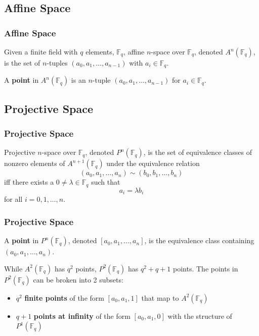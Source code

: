 \documentclass{beamer}
\begin{document}
    \subsection{Affine Space}
    \begin{frame}
        \frametitle{Affine Space}
        \begin{definition}
            Given a finite field with \(q\) elements, \(\mathbb{F}_q\),
            affine \(n\)-space over \(\mathbb{F}_q\), denoted
            \(A^n(\mathbb{F}_q)\), is the set of
            \(n\)-tuples \((a_0, a_1, \dots, a_{n - 1})\) with
            \(a_i \in \mathbb{F}_q.\)
        \end{definition}
        \vfill
        \begin{definition}
            A \textbf{point} in \(A^n(\mathbb{F}_q)\) is an \(n\)-tuple
            \((a_0, a_1, \dots, a_{n - 1})\) for \(a_i \in \mathbb{F}_q\).
        \end{definition}
    \end{frame}

    \subsection{Projective Space}
    \begin{frame}
        \frametitle{Projective Space}
        \begin{definition}
            Projective \(n\)-space over \(\mathbb{F}_q\), denoted
            \(P^n(\mathbb{F}_q)\), is the set of equivalence classes of
            nonzero elements of \(A^{n+1}(\mathbb{F}_q)\) under the
            equivalence relation
            \[(a_0, a_1, \dots, a_n) \sim (b_0, b_1, \dots, b_n)\] iff there
            exists a \(0 \neq \lambda \in \mathbb{F}_q\) such that
            \[a_i = \lambda b_i\] for all \(i = 0, 1, \dots, n\).
        \end{definition}
    \end{frame}

    \begin{frame}
        \frametitle{Projective Space}
        \begin{definition}
            A \textbf{point} in \(P^n(\mathbb{F}_q)\), denoted
            \([a_0, a_1, \dots, a_n]\), is the equivalence class
            containing \((a_0, a_1, \dots, a_n)\).
        \end{definition}
        \vfill
        While \(A^2(\mathbb{F}_q)\) has \(q^2\) points,
        \(P^2(\mathbb{F}_q)\) has \(q^2 + q + 1\) points.
        \vfill
        The points in \(P^2(\mathbb{F}_q)\) can be broken into 2 subsets:
        \begin{itemize}
            \item \(q^2\) \textbf{finite points} of the form \([a_0, a_1, 1]\)
                that map to \(A^2(\mathbb{F}_q)\)
            \item \(q+1\) \textbf{points at infinity} of the
                form \([a_0, a_1, 0]\)
                with the structure of \(P^1(\mathbb{F}_q)\)
        \end{itemize}
    \end{frame}
\end{document}
